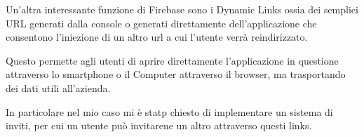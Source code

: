 
Un'altra interessante funzione di Firebase sono i Dynamic Links
ossia dei semplici URL generati dalla console o generati direttamente dell'applicazione
che consentono l'iniezione di un altro url a cui l'utente verrà reindirizzato.

Questo permette agli utenti di aprire direttamente l'applicazione in questione
attraverso lo smartphone o il Computer attraverso il browser, ma trasportando dei dati utili all'azienda.

In particolare nel mio caso mi è statp chiesto di implementare un sistema di inviti, per cui 
un utente può invitarene un altro attraverso questi links.

